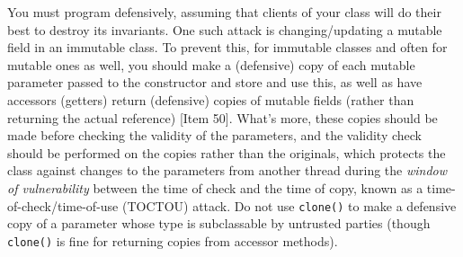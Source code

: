 \documentclass[table, xcdraw]{article}%
\begin{document}
You must program defensively, assuming that clients of your class will do their best to destroy its invariants. One such attack is changing/updating a mutable field in an immutable class. To prevent this, for immutable classes and often for mutable ones as well, you should make a (defensive) copy of each mutable parameter passed to the constructor and store and use this, as well as have accessors (getters) return (defensive) copies of mutable fields (rather than returning the actual reference) [Item 50]. What's more, these copies should be made before checking the validity of the parameters, and the validity check should be performed on the copies rather than the originals, which protects the class against changes to the parameters from another thread during the \emph{window of vulnerability} between the time of check and the time of copy, known as a time-of-check/time-of-use (TOCTOU) attack. Do not use \texttt{clone()} to make a defensive copy of a parameter whose type is subclassable by untrusted parties (though \texttt{clone()} is fine for returning copies from accessor methods).
\end{document}
